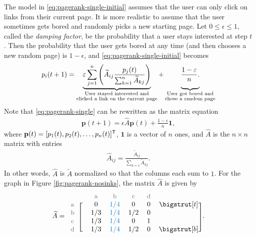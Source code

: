 The model in \eqref{eq:pagerank-single-initial} assumes that the user can only click on links from their current page.
It is more realistic to assume that the user sometimes gets bored and randomly picks a new starting page.
Let $0\le\epsilon\le 1$, called the \emph{damping factor}, be the probability that a user stays interested at step $t$.
Then the probability that the user gets bored at any time (and then chooses a new random page) is $1-\epsilon$, and \eqref{eq:pagerank-single-initial} becomes
\begin{equation}
\label{eq:pagerank-single}
p_i(t+1) =
\underbrace{\epsilon\sum_{j=1}^{n}\left(\widetilde{A}_{ij}\frac{p_j(t)}{\sum_{k=1}^n \widetilde{A}_{kj}}\right)}_{\substack{\text{User stayed interested and}\\\text{clicked a link on the current page}}}
+ \underbrace{\vphantom{\sum_{j=1}^{n}\left(\frac{p_j(t)}{\sum_{k=1}^n \widetilde{A}_{kj}}\right)} \frac{1-\epsilon}{n}.}_{\substack{\text{User got bored and}\\\text{chose a random page}}}
\end{equation}
Note that \eqref{eq:pagerank-single} can be rewritten as the matrix equation
\begin{align}
\mathbf{p}(t+1) = \epsilon \widehat{A}\mathbf{p}(t) + \frac{1-\epsilon}{n}\mathbf{1},
\label{eq:pagerank-matrix}
\end{align}
where $\mathbf{p}(t)=[p_1(t), p_2(t), \ldots, p_n(t)]^{\mathsf T}$,
$\mathbf{1}$ is a vector of $n$ ones, and $\widehat{A}$ is the $n\times n$ matrix with entries
\begin{align}
\widehat{A}_{ij} = \frac{\widetilde{A}_{ij}}{\sum_{k=1}\widetilde{A}_{kj}}.
\label{eq:pagerank-Ahat-entries}
\end{align}
In other words, $\widehat{A}$ is $\widetilde{A}$ normalized so that the columns each sum to $1$.
For the graph in Figure \ref{fig:pagerank-nosinks}, the matrix $\widehat{A}$ is given by
\begin{align}
\widehat{A} = \begin{blockarray}{ccccccc}
& & \small\text{\textcolor{gray}{a}} & \small\text{\textcolor{gray}{b}} & \small\text{\textcolor{gray}{c}} & \small\text{\textcolor{gray}{d}} & \\
\begin{block}{c[cccccc]}
\small\text{\textcolor{gray}{a}} & & 0 & \textcolor{blue}{1/4} & 0 & 0 & \topstrut\\
\small\text{\textcolor{gray}{b}} & & 1/3 & \textcolor{blue}{1/4} & 1/2 & 0 & \\
\small\text{\textcolor{gray}{c}} & & 1/3 & \textcolor{blue}{1/4} & 0 & 1 & \\
\small\text{\textcolor{gray}{d}} & & 1/3 & \textcolor{blue}{1/4} & 1/2 & 0 & \botstrut\\
\end{block}\end{blockarray}.
\label{eq:pagerank-example-widehat}
\end{align}

